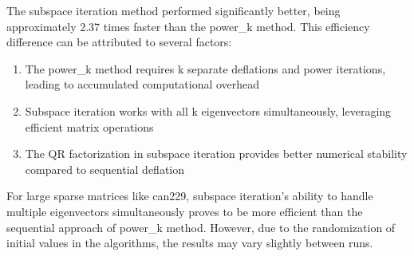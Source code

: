 \documentclass[11pt,a4paper, margin=1in]{article}
\begin{document}
\begin{enumerate}
    The subspace iteration method performed significantly better, being approximately 2.37 times faster than the power\_k method. This efficiency difference can be attributed to several factors:
    
    \begin{enumerate}
        \item The power\_k method requires k separate deflations and power iterations, leading to accumulated computational overhead
        \item Subspace iteration works with all k eigenvectors simultaneously, leveraging efficient matrix operations
        \item The QR factorization in subspace iteration provides better numerical stability compared to sequential deflation
    \end{enumerate}
    
    For large sparse matrices like can229, subspace iteration's ability to handle multiple eigenvectors simultaneously proves to be more efficient than the sequential approach of power\_k method. However, due to the randomization of initial values in the algorithms, the results may vary slightly between runs.

\end{enumerate}
\end{document}
